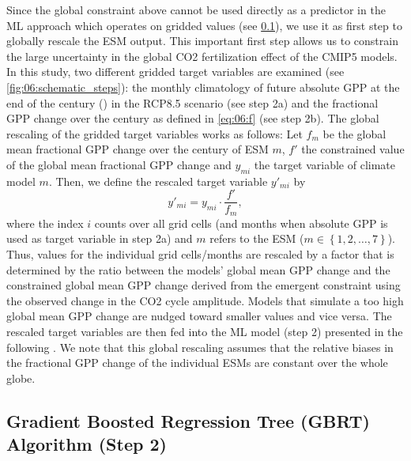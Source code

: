 Since the global constraint above cannot be used directly as a predictor in the
\ac{ML} approach which operates on gridded values (see
\cref{subsec:06:step_2}), we use it as first step to globally rescale the
\ac{ESM} output. This important first step allows us to constrain the large
uncertainty in the global \ac{CO2} fertilization effect of the \acs{CMIP}5
models. In this study, two different gridded target variables are examined (see
\cref{fig:06:schematic_steps}): the monthly climatology of future absolute
\ac{GPP} at the end of the  century () in the
\acs{RCP}8.5 scenario (see step 2a) and the fractional \acs{GPP} change over
the  century as defined in \cref{eq:06:f} (see step 2b). The global
rescaling of the gridded target variables works as follows: Let $f_m$ be the
global mean fractional \acs{GPP} change over the  century of \ac{ESM}
$m$, $f'$ the constrained value of the global mean fractional \ac{GPP} change
and $y_{mi}$ the target variable of climate model $m$. Then, we define the
rescaled target variable $y'_{mi}$ by
\begin{equation}
  y'_{mi} = y_{mi} \cdot \frac{f'}{f_m},
  \label{eq:06:y}
\end{equation}
where the index $i$ counts over all grid cells (and months when absolute
\ac{GPP} is used as target variable in step 2a) and $m$ refers to the \ac{ESM}
($m \in \left\{ 1, 2, \ldots, 7 \right\}$). Thus, values for the individual
grid cells/months are rescaled by a factor that is determined by the ratio
between the models' global mean \ac{GPP} change and the constrained global mean
\ac{GPP} change derived from the \textcite{Wenzel2016} emergent constraint
using the observed change in the \ac{CO2} cycle amplitude. Models that simulate
a too high global mean \ac{GPP} change are nudged toward smaller values and
vice versa. The rescaled target variables are then fed into the \ac{ML} model
(step 2) presented in the following . We note that
this global rescaling assumes that the relative biases in the fractional
\ac{GPP} change of the individual \acp{ESM} are constant over the whole globe.


\subsection{Gradient Boosted Regression Tree (\acs{GBRT}) Algorithm (Step 2)}
\label{subsec:06:step_2}

